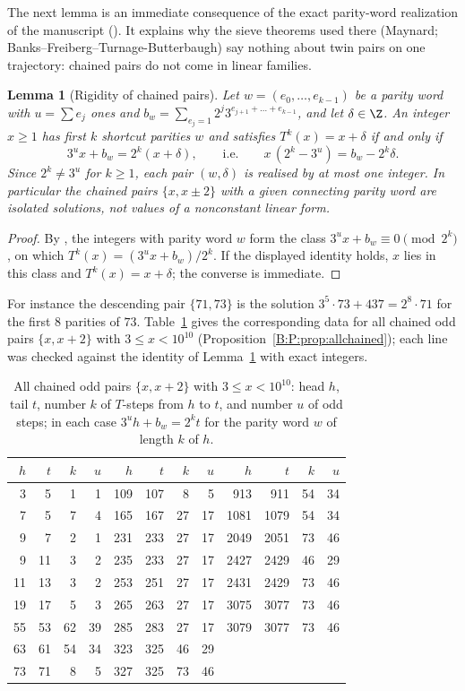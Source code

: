 \documentclass[11pt,a4paper]{article}
\newtheorem{lemma}[theorem]{Lemma}
\theoremstyle{definition}
\theoremstyle{remark}
\numberwithin{equation}{section}
\begin{document}
The next lemma is an immediate consequence of the exact parity-word realization
of the manuscript (\cite[proof of Theorem~5.1]{R021}). It explains why the
sieve theorems used there (Maynard; Banks--Freiberg--Turnage-Butterbaugh) say
nothing about twin pairs on one trajectory: chained pairs do not come in linear
families.

\begin{lemma}[Rigidity of chained pairs]\label{B:P:lem:rigid}
Let $w=(e_0,\dots,e_{k-1})$ be a parity word with $u=\sum e_j$ ones and
$b_w=\sum_{e_j=1}2^j3^{e_{j+1}+\dots+e_{k-1}}$, and let $\delta\in\Z$.
An integer $x\ge1$ has first $k$ shortcut parities $w$ and satisfies
$T^k(x)=x+\delta$ if and only if
\[
 3^ux+b_w=2^k(x+\delta),\qquad\text{i.e.}\qquad x\,(2^k-3^u)=b_w-2^k\delta .
\]
Since $2^k\ne3^u$ for $k\ge1$, each pair $(w,\delta)$ is realised by at most one
integer. In particular the chained pairs $\{x,x\pm2\}$ with a given connecting
parity word are isolated solutions, not values of a nonconstant linear form.
\end{lemma}

\begin{proof}
By \cite[proof of Theorem~5.1]{R021}, the integers with parity word $w$ form
the class $3^ux+b_w\equiv0\pmod{2^k}$, on which $T^k(x)=(3^ux+b_w)/2^k$. If the
displayed identity holds, $x$ lies in this class and $T^k(x)=x+\delta$; the
converse is immediate.
\end{proof}

For instance the descending pair $\{71,73\}$ is the solution
$3^5\cdot73+437=2^8\cdot71$ for the first $8$ parities of $73$.
Table~\ref{B:P:tab:chained} gives the corresponding data for all chained odd pairs
$\{x,x+2\}$ with $3\le x<10^{10}$ (Proposition~\ref{B:P:prop:allchained}); each line was
checked against the identity of Lemma~\ref{B:P:lem:rigid} with exact integers.

\begin{table}[ht]\centering\small
\caption{All chained odd pairs $\{x,x+2\}$ with $3\le x<10^{10}$: head $h$, tail $t$,
number $k$ of $T$-steps from $h$ to $t$, and number $u$ of odd steps; in each
case $3^uh+b_w=2^kt$ for the parity word $w$ of length $k$ of $h$.}
\label{B:P:tab:chained}
\begin{tabular}{rrrr@{\qquad}rrrr@{\qquad}rrrr}
\toprule
$h$&$t$&$k$&$u$&$h$&$t$&$k$&$u$&$h$&$t$&$k$&$u$\\\midrule
3&5&1&1&109&107&8&5&913&911&54&34\\
7&5&7&4&165&167&27&17&1081&1079&54&34\\
9&7&2&1&231&233&27&17&2049&2051&73&46\\
9&11&3&2&235&233&27&17&2427&2429&46&29\\
11&13&3&2&253&251&27&17&2431&2429&73&46\\
19&17&5&3&265&263&27&17&3075&3077&73&46\\
55&53&62&39&285&283&27&17&3079&3077&73&46\\
63&61&54&34&323&325&46&29&&&&\\
73&71&8&5&327&325&73&46&&&&\\
\bottomrule
\end{tabular}
\end{table}
\end{document}
